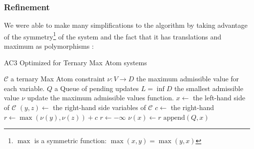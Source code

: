 \subsubsection{Refinement}
We were able to make many simplifications to the algorithm by taking advantage of the symmetry\footnote{$\max$ is a symmetric function: $\max(x,y)=\max(y,x)$} of the system and the fact that it has translations and maximum as polymorphisms \cite{TropicalCSP}:
\begin{algorithm}
	\caption{AC3 Optimized for Ternary Max Atom systems}\label{alg:AC3Optimized}
	\begin{algorithmic}
		\Require $\mathcal{C}$ a ternary Max Atom constraint
		\Require $\nu:V\rightarrow D$ the maximum admissible value for each variable.
		\Require $Q$ a Queue of pending updates
		\Require $L=\inf D$ the smallest admissible value
		\Ensure $\nu$ update the maximum admissible values function.
		\State	$x\leftarrow$ the left-hand side of $\mathcal{C}$
		\State	$(y,z)\leftarrow$ the right-hand side variables of $\mathcal{C}$
		\State	$c\leftarrow$ the right-hand
		\State $r\leftarrow \max(\nu(y),\nu(z))+c$
			\State $r\leftarrow -\infty$
		\EndIf
			\State $\nu(x)\leftarrow r$
			\State $\text{append}(Q,x)$
		\EndIf
	\end{algorithmic}
\end{algorithm}

